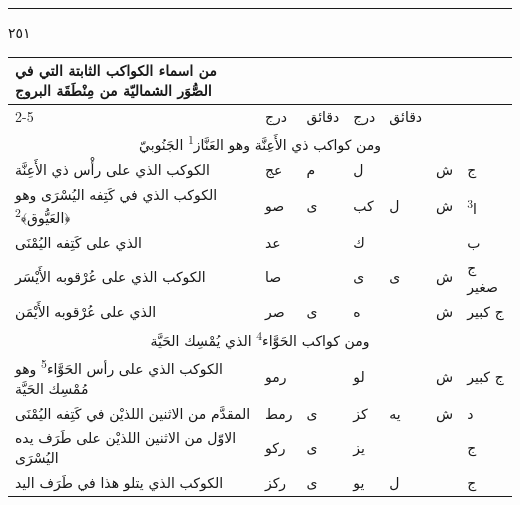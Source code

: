\documentclass[11pt]{article}
\newcommand{\AbjadZero}{{\NallinoSigns\symbol{"E000}}}
\begin{document}
\par\vspace{3mm}\noindent\rule{40mm}{.4pt}\par{}
\clearpage
{\large \textarabic{٢٥١}}\par\vspace{2mm}
\begin{Arabic}\begin{tabular}{|p{84mm}|>{\centering\arraybackslash}p{9mm}|>{\centering\arraybackslash}p{9mm}|>{\centering\arraybackslash}p{9mm}|>{\centering\arraybackslash}p{9mm}|>{\centering\arraybackslash}p{14mm}|>{\centering\arraybackslash}p{17mm}|}\hline
\multirow{2}{*}{\parbox{80mm}{\centering من اسماء الكواكب الثابتة التي في الصُّوَر الشماليّة من مِنْطَقَة البروج}} & \multicolumn{2}{c|}{الطول} & \multicolumn{2}{c|}{العرض} & \multirow{2}{*}{\parbox{13mm}{\centering\small علامات الجهة}} & \multirow{2}{*}{\parbox{16mm}{\centering\small مراتب العظمة}} \\ \cline{2-5}
 & {\small درج} & {\small دقائق} & {\small درج} & {\small دقائق} & & \\ \hline
\multicolumn{7}{|c|}{\large ومن كواكب ذي الأَعِنَّة وهو العَنَّاز\textsuperscript{1} الجَنُوبيّ} \\ \hline
الكوكب الذي على رأْس ذي الأَعِنَّة & عج & م & ل & \AbjadZero{} & ش & ج \\
الكوكب الذي في كَتِفه اليُسْرَى وهو ﴿العَيُّوق﴾\textsuperscript{2} & صو & ى & كب & ل & ش & ا\textsuperscript{3} \\
الذي على كَتِفه اليُمْنَى & عد & \AbjadZero{} & ك & \AbjadZero{} &  & ب \\
الكوكب الذي على عُرْقوبه الأَيْسَر & صا & \AbjadZero{} & ى & ى & ش & ج صغير \\
الذي على عُرْقوبه الأَيْمَن & صر & ى & ه & \AbjadZero{} & ش & ج كبير \\
\hline
\multicolumn{7}{|c|}{\large ومن كواكب الحَوَّاء\textsuperscript{4} الذي يُمْسِك الحَيَّة} \\ \hline
الكوكب الذي على رأس الحَوَّاء\textsuperscript{5} وهو مُمْسِك الحَيَّة & رمو & \AbjadZero{} & لو & \AbjadZero{} & ش & ج كبير \\
المقدَّم من الاثنين اللذيْن في كَتِفه اليُمْنَى & رمط & ى & كز & يه & ش & د \\
الاوّل من الاثنين اللذيْن على طَرَف يده اليُسْرَى & ركو & ى & يز & \AbjadZero{} &  & ج \\
الكوكب الذي يتلو هذا في طَرَف اليد & ركز & ى & يو & ل &  & ج \\

\end{tabular}
\end{Arabic}
\end{document}
